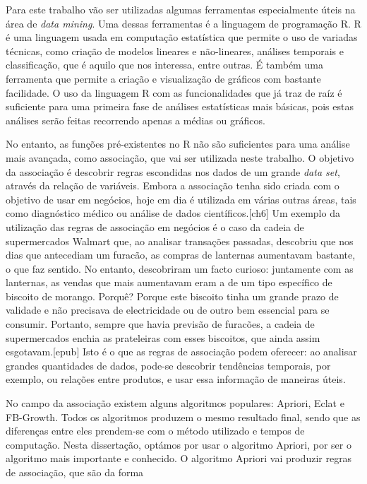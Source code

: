 Para este trabalho vão ser utilizadas algumas ferramentas especialmente úteis na área de \textit{data mining}. Uma dessas ferramentas é a linguagem de programação R. R é uma linguagem usada em computação estatística que permite o uso de variadas técnicas, como criação de modelos lineares e não-lineares, análises temporais e classificação, que é aquilo que nos interessa, entre outras. É também uma ferramenta que permite a criação e visualização de gráficos com bastante facilidade. O uso da linguagem R com as funcionalidades que já traz de raíz é suficiente para uma primeira fase de análises estatísticas mais básicas, pois estas análises serão feitas recorrendo apenas a médias ou gráficos.

No entanto, as funções pré-existentes no R não são suficientes para uma análise mais avançada, como associação, que vai ser utilizada neste trabalho. O objetivo da associação é descobrir regras escondidas nos dados de um grande \textit{data set}, através da relação de variáveis. Embora a associação tenha sido criada com o objetivo de usar em negócios, hoje em dia é utilizada em várias outras áreas, tais como diagnóstico médico ou análise de dados científicos.[ch6]
Um exemplo da utilização das regras de associação em negócios é o caso da cadeia de supermercados Walmart que, ao analisar transações passadas, descobriu que nos dias que antecediam um furacão, as compras de lanternas aumentavam bastante, o que faz sentido. No entanto, descobriram um facto curioso: juntamente com as lanternas, as vendas que mais aumentavam eram a de um tipo específico de biscoito de morango. Porquê? Porque este biscoito tinha um grande prazo de validade e não precisava de electricidade ou de outro bem essencial para se consumir. Portanto, sempre que havia previsão de furacões, a cadeia de supermercados enchia as prateleiras com esses biscoitos, que ainda assim esgotavam.[epub] 
Isto é o que as regras de associação podem oferecer: ao analisar grandes quantidades de dados, pode-se descobrir tendências temporais, por exemplo, ou relações entre produtos, e usar essa informação de maneiras úteis. 

No campo da associação existem alguns algoritmos populares: Apriori, Eclat e FB-Growth. Todos os algoritmos produzem o mesmo resultado final, sendo que as diferenças entre eles prendem-se com o método utilizado e tempos de computação. Nesta dissertação, optámos por usar o algoritmo Apriori, por ser o algoritmo mais importante e conhecido. O algoritmo Apriori vai produzir regras de associação, que são da forma

